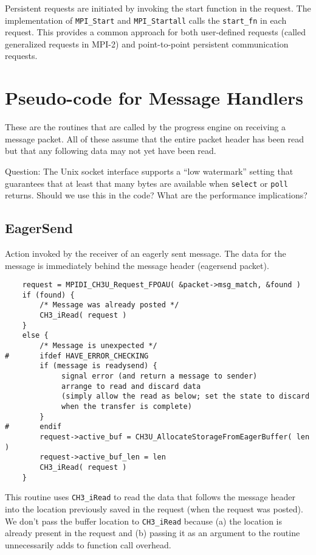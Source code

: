 \documentclass{article}
\def\code{\begingroup\makeustext\eatcode}
\def\eatcode#1{\texttt{#1}\endgroup}
\begin{document}
Persistent requests are initiated by invoking the start function in
the request.  The implementation of \code{MPI_Start} and
\code{MPI_Startall} calls the \code{start_fn} in each request.  This
provides a common approach for both user-defined requests (called
generalized requests in MPI-2) and point-to-point persistent
communication requests.

\section{Pseudo-code for Message Handlers}
\label{sec:handlers}
\label{sec:agent}
These are the routines that are called by the progress engine on receiving a
message packet.  All of these assume that the entire packet header has been 
read but that any following data may not yet have been read.  

Question: The Unix socket interface supports a ``low watermark''
setting that guarantees that at least that many bytes are available
when \code{select} or \code{poll} returns.  Should we use this in the
code?  What are the performance implications?

\subsection{EagerSend}
Action invoked by the receiver of an eagerly sent message.  The data for the
message is immediately behind the message header (eagersend packet).
\begin{verbatim}
    request = MPIDI_CH3U_Request_FPOAU( &packet->msg_match, &found )
    if (found) {
        /* Message was already posted */
        CH3_iRead( request )
    }
    else {
        /* Message is unexpected */
#       ifdef HAVE_ERROR_CHECKING
        if (message is readysend) {
             signal error (and return a message to sender)
             arrange to read and discard data 
             (simply allow the read as below; set the state to discard
             when the transfer is complete)
        }
#       endif
        request->active_buf = CH3U_AllocateStorageFromEagerBuffer( len )
        request->active_buf_len = len
        CH3_iRead( request )
    }
\end{verbatim}
This routine uses \code{CH3\_iRead} to read the data that follows the
message header into the location previously saved in the request (when
the request was posted).  We don't pass the buffer location to
\code{CH3\_iRead} because (a) the location is already present in the
request and (b) passing it as an argument to the routine unnecessarily
adds to function call overhead.
\end{document}

